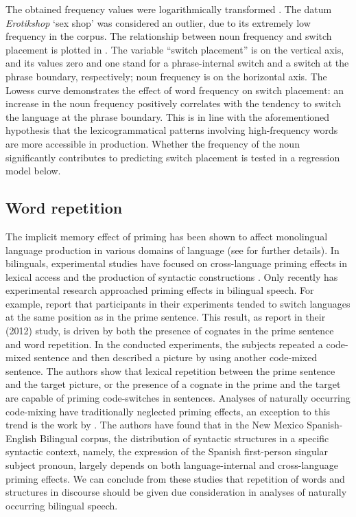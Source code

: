 The obtained frequency values were logarithmically transformed \citep[cf.][31]{baayen-analyzing}. The datum \textit{Erotikshop} `sex shop' was considered an outlier, due to its extremely low frequency in the corpus. The relationship between noun frequency and switch placement is plotted in . The variable “switch placement” is on the vertical axis, and its values zero and one stand for a phrase-internal switch and a switch at the phrase boundary, respectively; noun frequency is on the horizontal axis. The Lowess curve demonstrates the effect of word frequency on switch placement: an increase in the noun frequency positively correlates with the tendency to switch the language at the phrase boundary. This is in line with the aforementioned hypothesis that the lexicogrammatical patterns involving high-frequency words are more accessible in production. Whether the frequency of the noun significantly contributes to predicting switch placement is tested in a regression model below.

\subsection{Word repetition}

The implicit memory effect of priming has been shown to affect monolingual language production in various domains of language (see  for further details). In bilinguals, experimental studies have focused on cross-language priming effects in lexical access \citep{dijkstra-etal98, kroll-stewart94, vanhell-degroot98} and the production of syntactic constructions \citep{loebell-bock03, salamoura-williams06, schoonbaert-etal07}. Only recently has experimental research approached priming effects in bilingual speech. For example, \citep{kootstra-etal10} report that participants in their experiments tended to switch languages at the same position as in the prime sentence. This result, as \citeauthor{kootstra-etal12} report in their (2012) study, is driven by both the presence of cognates in the prime sentence and word repetition. In the conducted experiments, the subjects repeated a code-mixed sentence and then described a picture by using another code-mixed sentence. The authors show that lexical repetition between the prime sentence and the target picture, or the presence of a cognate in the prime and the target are capable of priming code-switches in sentences. Analyses of naturally occurring code-mixing have traditionally neglected priming effects, an exception to this trend is the work by \citep{torres-travis}. The authors have found that in the New Mexico Spanish-English Bilingual corpus, the distribution of syntactic structures in a specific syntactic context, namely, the expression of the Spanish first-person singular subject pronoun, largely depends on both language-internal and cross-language priming effects. We can conclude from these studies that repetition of words and structures in discourse should be given due consideration in analyses of naturally occurring bilingual speech. 


